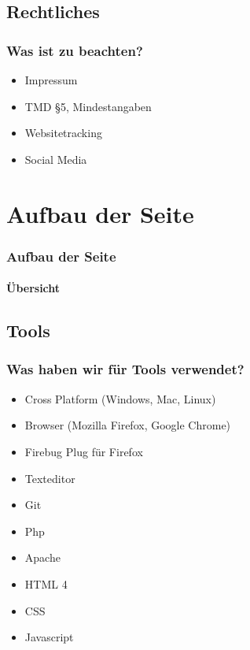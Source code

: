 \documentclass[xcolor=dvipsnames]{beamer}
\begin{document}
\subsection{Rechtliches}
\begin{frame} %
  \frametitle{Was ist zu beachten?} %
  \begin{block}{}
	\begin{itemize}
		\item Impressum
		\item TMD §5, Mindestangaben
		\item Websitetracking
		\item Social Media
	\end{itemize}
  \end{block}
\end{frame}


\section{Aufbau der Seite}
\begin{frame}[shrink] %
  \frametitle{Aufbau der Seite} %
  \framesubtitle{Übersicht} %
\end{frame}


\subsection{Tools}
\begin{frame} %
  \frametitle{Was haben wir für Tools verwendet?} %
  \begin{block}{}
	  \begin{itemize}
		\item Cross Platform (Windows, Mac, Linux)
		\item Browser (Mozilla Firefox, Google Chrome)  	
		\item Firebug Plug für Firefox
  		\item Texteditor
	  	\item Git
		\item Php
		\item Apache
		\item HTML 4
		\item CSS
		\item Javascript
	  \end{itemize}
  \end{block}
\end{frame}
\end{document}
